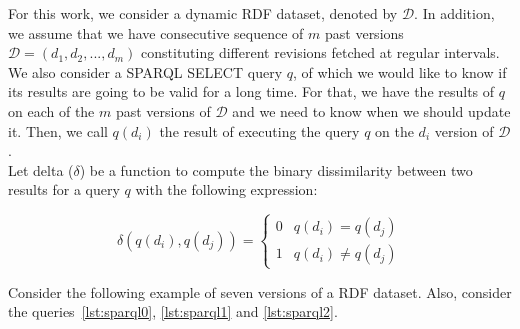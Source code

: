 \documentclass[runningheads]{llncs}
\begin{document}
For this work, we consider a dynamic RDF dataset, denoted by $\mathcal{D}$. In addition, we assume that we have consecutive sequence of $m$ past versions $\mathcal{D} = (d_1, d_2, ..., d_m)$ constituting different revisions fetched at regular intervals. We also consider a SPARQL SELECT query $q$, of which we would like to know if its results are going to be valid for a long time. For that, we have the results of $q$ on each of the $m$ past versions of $\mathcal{D}$ and we need to know when we should update it. Then, we call $q(d_i)$ the result of executing the query $q$ on the $d_i$ version of $\mathcal{D}$.\\

Let delta ($\delta$) be a function to compute the binary dissimilarity between two results for a query $q$ with the following expression:

\begin{equation}
\label{eq:delta}
\delta(q(d_i), q(d_j)) = \begin{cases}
0 & q(d_i) = q(d_j) \\
1 & q(d_i) \neq q(d_j) 
\end{cases}
\end{equation}

\begin{example}
	\label{ex:dataset}    
	Consider the following example of seven versions of a RDF dataset. Also, consider the queries~\ref{lst:sparql0}, \ref{lst:sparql1} and \ref{lst:sparql2}.
\end{example}
\end{document}
